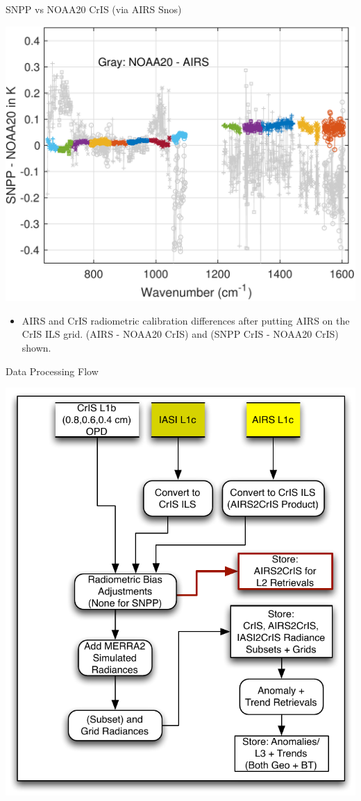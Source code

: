 \documentclass[10pt,t]{beamer}
\begin{document}
\begin{frame}[label={sec:org66ddde2}]{SNPP vs NOAA20 CrIS (via AIRS Snos)}
\vspace{-0.1in}

\begin{center}
\includegraphics[width=0.7\linewidth]{./oFigs/sno_march2018_snpp_minus_noaa20_with_c2_airs_ingrey.pdf}
\end{center}

\vspace{-0.1in}

\small
\begin{itemize}
\item AIRS and CrIS radiometric calibration differences after putting AIRS on the CrIS ILS grid.  (AIRS - NOAA20 CrIS) and (SNPP CrIS - NOAA20 CrIS) shown.
\end{itemize}
\end{frame}

\begin{frame}[label=flow]{Data Processing Flow}
\vspace{-0.1in}
\begin{center}
\includegraphics[width=0.64\linewidth]{./oFigs/airs2cris_vx_sounding.pdf}
\end{center}
\end{frame}
\end{document}
